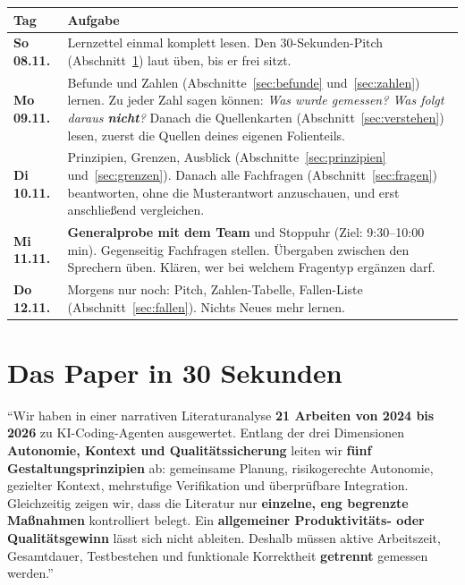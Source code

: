 \documentclass[12pt,a4paper]{article}
\begin{document}
\begin{longtable}{@{}>{\bfseries}p{2.6cm}p{13.6cm}@{}}
\toprule
Tag & Aufgabe \\
\midrule
\endhead
So 08.11. & Lernzettel einmal komplett lesen. Den 30-Sekunden-Pitch (Abschnitt~\ref{sec:pitch}) laut üben, bis er frei sitzt. \\
Mo 09.11. & Befunde und Zahlen (Abschnitte~\ref{sec:befunde} und~\ref{sec:zahlen}) lernen. Zu jeder Zahl sagen können: \emph{Was wurde gemessen? Was folgt daraus \textbf{nicht}?} Danach die Quellenkarten (Abschnitt~\ref{sec:verstehen}) lesen, zuerst die Quellen deines eigenen Folienteils. \\
Di 10.11. & Prinzipien, Grenzen, Ausblick (Abschnitte~\ref{sec:prinzipien} und~\ref{sec:grenzen}). Danach alle Fachfragen (Abschnitt~\ref{sec:fragen}) beantworten, ohne die Musterantwort anzuschauen, und erst anschließend vergleichen. \\
Mi 11.11. & \textbf{Generalprobe mit dem Team} und Stoppuhr (Ziel: 9:30--10:00 min). Gegenseitig Fachfragen stellen. Übergaben zwischen den Sprechern üben. Klären, wer bei welchem Fragentyp ergänzen darf. \\
Do 12.11. & Morgens nur noch: Pitch, Zahlen-Tabelle, Fallen-Liste (Abschnitt~\ref{sec:fallen}). Nichts Neues mehr lernen. \\
\bottomrule
\end{longtable}

\section{Das Paper in 30 Sekunden}
\label{sec:pitch}

\begin{merke}
\enquote{Wir haben in einer narrativen Literaturanalyse \textbf{21 Arbeiten von 2024 bis 2026} zu KI-Coding-Agenten ausgewertet. Entlang der drei Dimensionen \textbf{Autonomie, Kontext und Qualitätssicherung} leiten wir \textbf{fünf Gestaltungsprinzipien} ab: gemeinsame Planung, risikogerechte Autonomie, gezielter Kontext, mehrstufige Verifikation und überprüfbare Integration. Gleichzeitig zeigen wir, dass die Literatur nur \textbf{einzelne, eng begrenzte Maßnahmen} kontrolliert belegt. Ein \textbf{allgemeiner Produktivitäts- oder Qualitätsgewinn} lässt sich nicht ableiten. Deshalb müssen aktive Arbeitszeit, Gesamtdauer, Testbestehen und funktionale Korrektheit \textbf{getrennt} gemessen werden.}
\end{merke}
\end{document}
